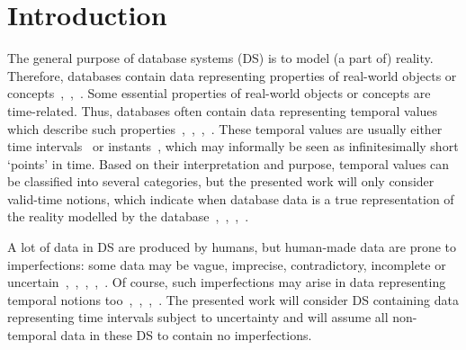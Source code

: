 \documentclass[runningheads,a4paper]{llncs}
\begin{document}
\section{Introduction}
The general purpose of database systems (DS) is to model (a part of) reality. Therefore, databases contain data representing properties of real-world objects or concepts~\cite{Pons2012ijcis},~\cite{Billiet2012ipmu},~\cite{Pons2012ipmu}. Some essential properties of real-world objects or concepts are time-related. Thus, databases often contain data representing temporal values which describe such properties~\cite{Pons2012ijcis},~\cite{Bolour1982acm},~\cite{Jensen1999ieeetkde},~\cite{Galindo2001}. These temporal values are usually either time intervals~\cite{Bohlen1998lncs} or instants~\cite{Bohlen1998lncs}, which may informally be seen as infinitesimally short `points' in time. Based on their interpretation and purpose, temporal values can be classified into several categories, but the presented work will only consider valid-time notions, which indicate when database data is a true representation of the reality modelled by the database~\cite{Bohlen1998lncs},~\cite{Pons2012ijcis},~\cite{Billiet2012ipmu},~\cite{Pons2012ipmu}.

A lot of data in DS are produced by humans, but human-made data are prone to imperfections: some data may be vague, imprecise, contradictory, incomplete or uncertain~\cite{Billiet2012ipmu},~\cite{Pons2012ipmu},~\cite{Medina1994is},~\cite{Bosc2010ijufkbs},~\cite{Bosc2009sum}. Of course, such imperfections may arise in data representing temporal notions too~\cite{Billiet2012ipmu},~\cite{Pons2012ipmu},~\cite{Pons2012ijcis},~\cite{Dyreson1998acm}. The presented work will consider DS containing data representing time intervals subject to uncertainty and will assume all non-temporal data in these DS to contain no imperfections.
\end{document}
